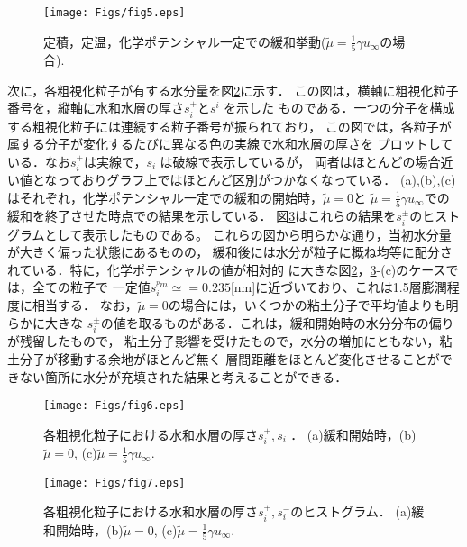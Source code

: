 \begin{figure}[h]
	\begin{center}
	\texttt{[image: Figs/fig5.eps]} 
	\end{center}
	\caption{
		定積，定温，化学ポテンシャル一定での緩和挙動($\tilde \mu =\frac{1}{5}\gamma u_{\infty}$の場合).
	} 
	\label{fig:fig5}
\end{figure}
次に，各粗視化粒子が有する水分量を図\ref{fig:fig6}に示す．
この図は，横軸に粗視化粒子番号を，縦軸に水和水層の厚さ$s_i^+$と$s^i_-$を示した
ものである．一つの分子を構成する粗視化粒子には連続する粒子番号が振られており，
この図では，各粒子が属する分子が変化するたびに異なる色の実線で水和水層の厚さを
プロットしている．なお$s^+_i$は実線で，$s^-_i$は破線で表示しているが，
両者はほとんどの場合近い値となっておりグラフ上ではほとんど区別がつかなくなっている．
(a),(b),(c)はそれぞれ，化学ポテンシャル一定での緩和の開始時，$\tilde \mu =0$と
$\tilde \mu =\frac{1}{5}\gamma u_{\infty}$での緩和を終了させた時点での結果を示している．
図\ref{fig:fig7}はこれらの結果を$s^\pm_i$のヒストグラムとして表示したものである。
これらの図から明らかな通り，当初水分量が大きく偏った状態にあるものの，
緩和後には水分が粒子に概ね均等に配分されている．特に，化学ポテンシャルの値が相対的
に大きな図\ref{fig:fig6}，\ref{fig:fig7}-(c)のケースでは，全ての粒子で
一定値$s^{^pm}_i\simeq =0.235$[nm]に近づいており、これは1.5層膨潤程度に相当する．
なお，$\tilde \mu=0$の場合には，いくつかの粘土分子で平均値よりも明らかに大きな
$s^\pm_i$の値を取るものがある．これは，緩和開始時の水分分布の偏りが残留したもので，
粘土分子影響を受けたもので，水分の増加にともない，粘土分子が移動する余地がほとんど無く
層間距離をほとんど変化させることができない箇所に水分が充填された結果と考えることができる．
\begin{figure}[h]
	\begin{center}
	\texttt{[image: Figs/fig6.eps]} 
	\end{center}
	\caption{
		各粗視化粒子における水和水層の厚さ$s_i^+,s_i^-$．
		(a)緩和開始時，(b)$\tilde \mu=0$, (c)$\tilde \mu =\frac{1}{5}\gamma u_\infty.$
	} 
	\label{fig:fig6}
\end{figure}
\begin{figure}[h]
	\begin{center}
	\texttt{[image: Figs/fig7.eps]} 
	\end{center}
	\caption{
		各粗視化粒子における水和水層の厚さ$s_i^+,s_i^-$のヒストグラム．
		(a)緩和開始時，(b)$\tilde \mu=0$, (c)$\tilde \mu =\frac{1}{5}\gamma u_\infty.$
	} 
	\label{fig:fig7}
\end{figure}
